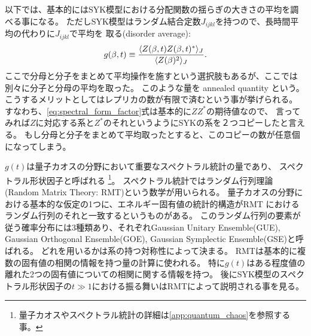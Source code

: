 以下では、基本的にはSYK模型における分配関数の揺らぎの大きさの平均を調べる事になる。
ただしSYK模型はランダム結合定数$J_{ijkl}$を持つので、長時間平均の代わりに$J_{ijkl}$で平均を
取る(disorder average):
\begin{align}
	g(\beta, t) \equiv
	\frac{\langle Z(\beta, t)Z(\beta, t)^* \rangle_J}{\langle Z(\beta)^2 \rangle_J}.
	\label{eq:spectral_form_factor}
\end{align}
ここで分母と分子をまとめて平均操作を施すという選択肢もあるが、ここでは別々に分子と分母の平均を取った。
このような量を annealed quantity という。
こうするメリットとしてはレプリカの数が有限で済むという事が挙げられる。
すなわち、\eqref{eq:spectral_form_factor}式は基本的に$ZZ^*$の期待値なので、
言ってみれば$Z$に対応する系と$Z^*$のそれというようにSYKの系を２つコピーしたと言える。
もし分母と分子をまとめて平均取ったとすると、このコピーの数が任意個になってしまう。

$g(t)$は量子カオスの分野において重要なスペクトラル統計の量であり、
スペクトラル形状因子と呼ばれる
\footnote{量子カオスやスペクトラル統計の詳細は\ref{app:quantum_chaos}を参照する事。}。
スペクトラル統計ではランダム行列理論(Random Matrix Theory: RMT)という数学が用いられる。
量子カオスの分野における基本的な仮定の1つに、エネルギー固有値の統計的構造がRMT
におけるランダム行列のそれと一致するというものがある。
このランダム行列の要素が従う確率分布には3種類あり、それぞれGaussian Unitary Ensemble(GUE),
Gaussian Orthogonal Ensemble(GOE), Gaussian Symplectic Ensemble(GSE)と呼ばれる。
どれを用いるかは系の持つ対称性によって決まる。
RMTは基本的に複数の固有値の相関の情報を持つ量の計算に使われる。
特に$g(t)$はある程度値の離れた2つの固有値についての相関に関する情報を持つ。
後にSYK模型のスペクトラル形状因子の$t \gg 1$における振る舞いはRMTによって説明される事を見る。

